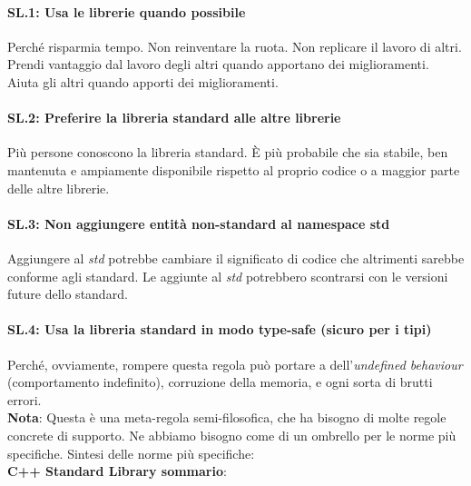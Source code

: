 \paragraph{SL.1: Usa le librerie quando possibile}

\textsf{\small Perché risparmia tempo. Non reinventare la ruota. Non replicare il lavoro di altri. Prendi vantaggio dal lavoro degli altri quando apportano dei miglioramenti. Aiuta gli altri quando apporti dei miglioramenti.} \\

\paragraph{SL.2: Preferire la libreria standard alle altre librerie}

\textsf{\small Più persone conoscono la libreria standard. È più probabile che sia stabile, ben mantenuta e ampiamente disponibile rispetto al proprio codice o a maggior parte delle altre librerie.} \\

\paragraph{SL.3: Non aggiungere entità non-standard al namespace std}

\textsf{\small Aggiungere al \emph{std} potrebbe cambiare il significato di codice che altrimenti sarebbe conforme agli standard. Le aggiunte al \emph{std} potrebbero scontrarsi con le versioni future dello standard.} \\

\paragraph{SL.4: Usa la libreria standard in modo type-safe (sicuro per i tipi)}

\textsf{\small Perché, ovviamente, rompere questa regola può portare a dell'\emph{undefined behaviour} (comportamento indefinito), corruzione della memoria, e ogni sorta di brutti errori.} \\

\textsf{\small \textbf{Nota}: Questa è una meta-regola semi-filosofica, che ha bisogno di molte regole concrete di supporto. Ne abbiamo bisogno come di un ombrello per le norme più specifiche. Sintesi delle norme più specifiche:} \\

\textsf{\small \textbf{C++ Standard Library sommario}: }

